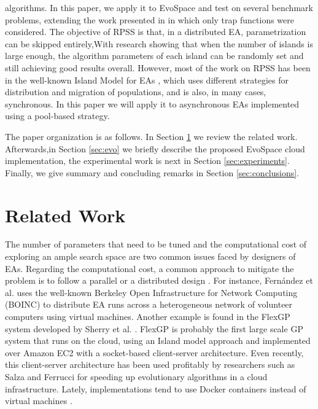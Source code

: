 \documentclass[conference]{IEEEtran}
\begin{document}
algorithms.
In this paper, we apply it to EvoSpace and test on
several benchmark problems, extending the work presented in \cite{LNCS86720702}
in which only trap functions were considered.
The objective of RPSS is that, in a distributed EA, parametrization 
can be skipped entirely,With research showing that when the number of islands
is large enough, the algorithm parameters of each island can be randomly
set and still achieving good results overall. However, most of the work on 
RPSS has been in the well-known Island Model for EAs
\cite{ALBA2001451}, which uses different strategies for distribution
and migration of populations, and is also, in many cases, synchronous.
In this paper we will apply 
it to asynchronous EAs implemented using a pool-based strategy.

The paper organization is as follows. In Section \ref{sec:work} we
review the related work. Afterwards,in Section \ref{sec:evo} we briefly describe the
proposed EvoSpace cloud implementation, the experimental work is next in
Section \ref{sec:experiments}. Finally, we give summary and concluding remarks in
Section \ref{sec:conclusions}.

\section{Related Work}
\label{sec:work}

The number of parameters that need to be tuned and the computational cost of
exploring an ample search space are two common issues faced by designers of
EAs. Regarding the computational cost, a common approach to mitigate the
problem is to follow a parallel or a distributed design \cite{cantu-paz:migration-policies,duda2013gpu}.
For instance, Fern\'andez et al. \cite{nc} 
uses the well-known Berkeley Open Infrastructure for Network Computing (BOINC) to distribute EA runs across a
heterogeneous network of volunteer computers using virtual machines. Another  example is
found in the FlexGP system developed by Sherry et al. \cite{FlexGP}. FlexGP is probably the first large scale GP system
that runs on the cloud, using an Island model approach and implemented over Amazon EC2 with a
socket-based client-server architecture. Even recently, this client-server architecture has been used profitably by researchers such as Salza and Ferrucci \cite{SALZA2019276} for speeding up evolutionary algorithms in a cloud infrastructure. Lately, implementations tend to use Docker containers instead of virtual machines \cite{Dziurzanski2020}.
\end{document}
